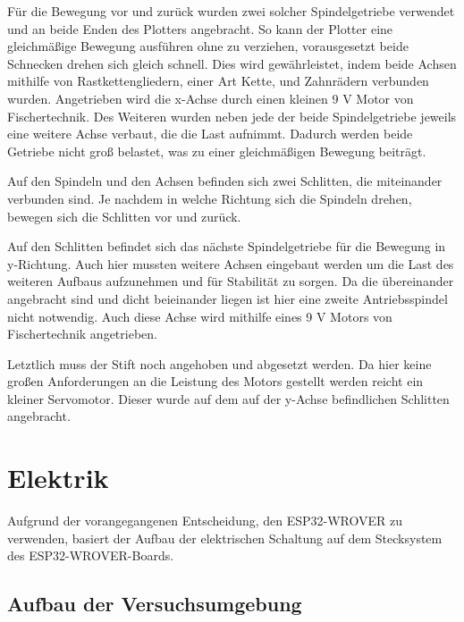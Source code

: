 \documentclass[conference,compsoc,final,a4paper]{IEEEtran}
\begin{document}
Für die Bewegung vor und zurück wurden zwei solcher Spindelgetriebe verwendet und an beide Enden
des Plotters angebracht. So kann der Plotter eine gleichmäßige Bewegung ausführen ohne zu verziehen,
vorausgesetzt beide Schnecken drehen sich gleich schnell. Dies wird gewährleistet, indem beide 
Achsen mithilfe von Rastkettengliedern, einer Art Kette, und Zahnrädern verbunden wurden.
Angetrieben wird die x-Achse durch einen kleinen 9 V Motor von Fischertechnik. Des Weiteren
wurden neben jede der beide Spindelgetriebe jeweils eine weitere Achse verbaut, die die Last
aufnimmt. Dadurch werden beide Getriebe nicht groß belastet, was zu einer gleichmäßigen Bewegung
beiträgt.

Auf den Spindeln und den Achsen befinden sich zwei Schlitten, die miteinander verbunden sind.
Je nachdem in welche Richtung sich die Spindeln drehen, bewegen sich die Schlitten vor und zurück.

Auf den Schlitten befindet sich das nächste Spindelgetriebe für die Bewegung in y-Richtung.
Auch hier mussten weitere Achsen eingebaut werden um die Last des weiteren Aufbaus aufzunehmen
und für Stabilität zu sorgen. Da die übereinander angebracht sind und dicht beieinander liegen
ist hier eine zweite Antriebsspindel nicht notwendig. Auch diese Achse wird mithilfe eines 9 V
Motors von Fischertechnik angetrieben.

Letztlich muss der Stift noch angehoben und abgesetzt werden. Da hier keine großen Anforderungen
an die Leistung des Motors gestellt werden reicht ein kleiner Servomotor. Dieser wurde auf dem auf
der y-Achse befindlichen Schlitten angebracht.

\section{Elektrik}
Aufgrund der vorangegangenen Entscheidung, den ESP32-WROVER zu verwenden, basiert der Aufbau der elektrischen Schaltung auf dem Stecksystem des ESP32-WROVER-Boards.


\subsection{Aufbau der Versuchsumgebung}
\end{document}
